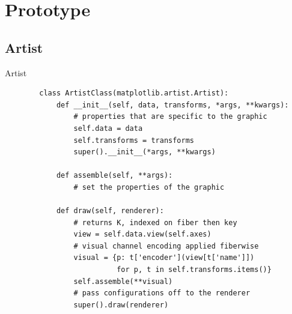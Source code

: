 \documentclass[xcolor={dvipsnames}, handout]{beamer}
\begin{document}
\section{Prototype}
\subsection{Artist}
\begin{frame}[fragile]{Artist}
    \begin{verbatim}
        class ArtistClass(matplotlib.artist.Artist):
            def __init__(self, data, transforms, *args, **kwargs):
                # properties that are specific to the graphic
                self.data = data 
                self.transforms = transforms
                super().__init__(*args, **kwargs)
        
            def assemble(self, **args):
                # set the properties of the graphic
        
            def draw(self, renderer):
                # returns K, indexed on fiber then key 
                view = self.data.view(self.axes) 
                # visual channel encoding applied fiberwise 
                visual = {p: t['encoder'](view[t['name']])
                          for p, t in self.transforms.items()}
                self.assemble(**visual)
                # pass configurations off to the renderer
                super().draw(renderer)
        \end{verbatim}
\end{frame}
\end{document}
